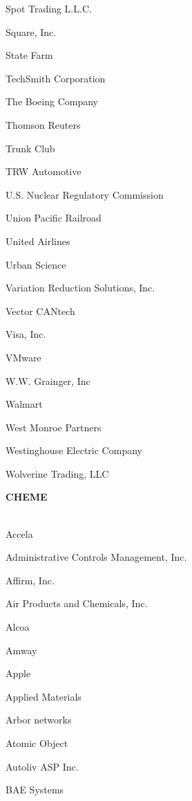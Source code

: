 \documentclass[twoside]{article}
\begin{document}
\begin{center}
\begin{multicols}{5}
\begin{FlushLeft}
\begin{compactitem}
\item Spot Trading L.L.C.
\item Square, Inc.
\item State Farm
\item TechSmith Corporation
\item The Boeing Company
\item Thomson Reuters
\item Trunk Club
\item TRW Automotive
\item U.S. Nuclear Regulatory Commission
\item Union Pacific Railroad
\item United Airlines
\item Urban Science
\item Variation Reduction Solutions, Inc.
\item Vector CANtech
\item Visa, Inc.
\item VMware
\item W.W. Grainger, Inc
\item Walmart
\item West Monroe Partners
\item Westinghouse Electric Company
\item Wolverine Trading, LLC
\end{compactitem}
        \end{FlushLeft}
        \vspace{1em}
        {\fontsize{14}{16}\selectfont \bf CHEME}\\
        \vspace{-1em}
        ~\hrulefill~
        \vspace{-.9em}
        \begin{FlushLeft}
        \begin{compactitem}
        \item Accela
\item Administrative Controls Management, Inc.
\item Affirm, Inc.
\item Air Products and Chemicals, Inc.
\item Alcoa
\item Amway
\item Apple
\item Applied Materials
\item Arbor networks
\item Atomic Object
\item Autoliv ASP Inc.
\item BAE Systems

\end{compactitem}
\end{FlushLeft}
\end{multicols}
\end{center}
\end{document}
